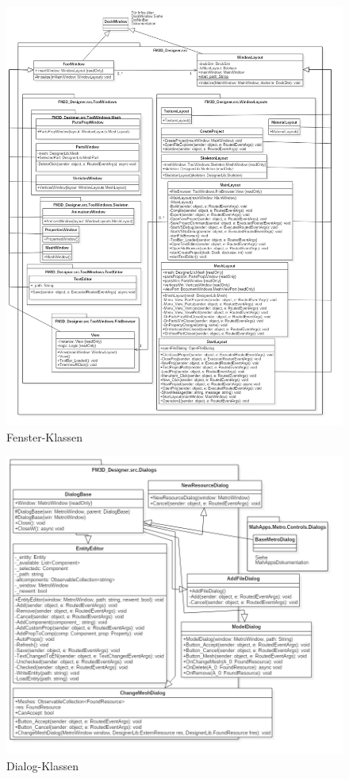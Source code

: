 \begin{figure}
	\begin{center}
		\includegraphics[height=\textheight]{03unserprogramm/Designer/Layouts.png}
		\caption{Fenster-Klassen}\label{windowclass}
	\end{center}
\end{figure}

\begin{figure}
	\begin{center}
		\includegraphics[width=\textwidth]{03unserprogramm/Designer/Dialogs.png}
		\caption{Dialog-Klassen}\label{dialogclass}
	\end{center}
\end{figure}

